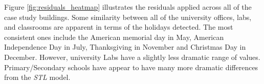 Figure \ref{fig:residuals_heatmap} illustrates the residuals applied across all of the case study buildings. Some similarity between all of the university offices, labs, and classrooms are apparent in terms of the holidays detected. The most consistent ones include the American memorial day in May, American Independence Day in July, Thanksgiving in November and Christmas Day in December. However, university Labs have a slightly less dramatic range of values. Primary/Secondary schools have appear to have many more dramatic differences from the \emph{STL} model. 